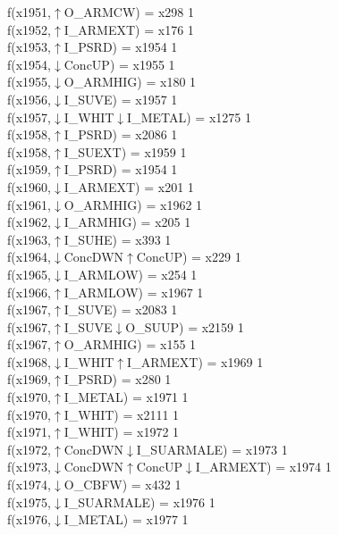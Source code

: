 f(x1951,$\uparrow$O\_ARMCW) = x298 {1} \\
f(x1952,$\uparrow$I\_ARMEXT) = x176 {1} \\
f(x1953,$\uparrow$I\_PSRD) = x1954 {1} \\
f(x1954,$\downarrow$ConcUP) = x1955 {1} \\
f(x1955,$\downarrow$O\_ARMHIG) = x180 {1} \\
f(x1956,$\downarrow$I\_SUVE) = x1957 {1} \\
f(x1957,$\downarrow$I\_WHIT$\downarrow$I\_METAL) = x1275 {1} \\
f(x1958,$\uparrow$I\_PSRD) = x2086 {1} \\
f(x1958,$\uparrow$I\_SUEXT) = x1959 {1} \\
f(x1959,$\uparrow$I\_PSRD) = x1954 {1} \\
f(x1960,$\downarrow$I\_ARMEXT) = x201 {1} \\
f(x1961,$\downarrow$O\_ARMHIG) = x1962 {1} \\
f(x1962,$\downarrow$I\_ARMHIG) = x205 {1} \\
f(x1963,$\uparrow$I\_SUHE) = x393 {1} \\
f(x1964,$\downarrow$ConcDWN$\uparrow$ConcUP) = x229 {1} \\
f(x1965,$\downarrow$I\_ARMLOW) = x254 {1} \\
f(x1966,$\uparrow$I\_ARMLOW) = x1967 {1} \\
f(x1967,$\uparrow$I\_SUVE) = x2083 {1} \\
f(x1967,$\uparrow$I\_SUVE$\downarrow$O\_SUUP) = x2159 {1} \\
f(x1967,$\uparrow$O\_ARMHIG) = x155 {1} \\
f(x1968,$\downarrow$I\_WHIT$\uparrow$I\_ARMEXT) = x1969 {1} \\
f(x1969,$\uparrow$I\_PSRD) = x280 {1} \\
f(x1970,$\uparrow$I\_METAL) = x1971 {1} \\
f(x1970,$\uparrow$I\_WHIT) = x2111 {1} \\
f(x1971,$\uparrow$I\_WHIT) = x1972 {1} \\
f(x1972,$\uparrow$ConcDWN$\downarrow$I\_SUARMALE) = x1973 {1} \\
f(x1973,$\downarrow$ConcDWN$\uparrow$ConcUP$\downarrow$I\_ARMEXT) = x1974 {1} \\
f(x1974,$\downarrow$O\_CBFW) = x432 {1} \\
f(x1975,$\downarrow$I\_SUARMALE) = x1976 {1} \\
f(x1976,$\downarrow$I\_METAL) = x1977 {1} \\
